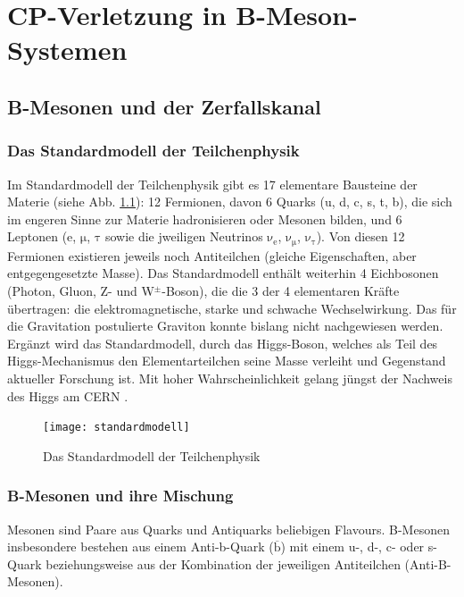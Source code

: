 \chapter{CP-Verletzung in B-Meson-Systemen}

\section{B-Mesonen und der Zerfallskanal \Decaychannel}
\subsection{Das Standardmodell der Teilchenphysik}
Im Standardmodell der Teilchenphysik gibt es 17 elementare Bausteine der Materie (siehe Abb. \ref{fig:standardmodell}): 12 Fermionen, davon 6 Quarks (u, d, c, s, t, b), die sich im engeren Sinne zur Materie hadronisieren oder Mesonen bilden, und 6 Leptonen (e, $\mathrm{\mu}$, $\mathrm{\tau}$ sowie die jweiligen Neutrinos $\mathrm{\nu_e}$, $\mathrm{\nu_{\mu}}$, $\mathrm{\nu_{\tau}}$). Von diesen 12 Fermionen existieren jeweils noch Antiteilchen (gleiche Eigenschaften, aber entgegengesetzte Masse). Das Standardmodell enthält weiterhin 4 Eichbosonen (Photon, Gluon, Z- und W$^{\pm}$-Boson), die die 3 der 4 elementaren Kräfte übertragen: die elektromagnetische, starke und schwache Wechselwirkung. Das für die Gravitation postulierte Graviton konnte bislang nicht nachgewiesen werden. Ergänzt wird das Standardmodell, durch das Higgs-Boson, welches als Teil des Higgs-Mechanismus den Elementarteilchen seine Masse verleiht und Gegenstand aktueller Forschung ist. Mit hoher Wahrscheinlichkeit gelang jüngst der Nachweis des Higgs am CERN \cite{higgs}.

\begin{figure}[hptb]
\centering
\texttt{[image: standardmodell]}
\caption{Das Standardmodell der Teilchenphysik \cite{wiki_standard}}
\label{fig:standardmodell}
\end{figure}

\subsection{B-Mesonen und ihre Mischung}
Mesonen sind Paare aus Quarks und Antiquarks beliebigen Flavours. B-Mesonen insbesondere bestehen aus einem Anti-b-Quark ($\mathrm{\overline{b}}$) mit einem u-, d-, c- oder s-Quark beziehungsweise aus der Kombination der jeweiligen Antiteilchen (Anti-B-Mesonen).

